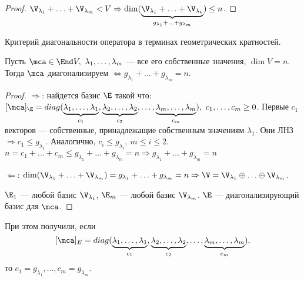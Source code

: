 \documentclass[main]{subfiles}
\begin{document}
\begin{proof}
    $\V_{\lambda_1} + \ldots + \V_{\lambda_m} < V 
    \Rightarrow \dim (\underbrace{\V_{\lambda_1} + \ldots + \V_{\lambda_k}}_{g_{\lambda_1} + \ldots + g_{\lambda_m}}) \leq n$.
\end{proof}

\begin{proposition}
    Критерий диагональности оператора в терминах геометрических кратностей.

    Пусть $\mca \in \End V,\ \lambda_1, \ldots, \lambda_m$  — все его собственные значения, 
    $\dim V = n$. Тогда $\mca$  диагонализируем $\Leftrightarrow
    g_{\lambda_1} + \ldots +  g_{\lambda_m} = n$.
\end{proposition}

\begin{proof}
    $\Rightarrow$: найдется базис $\E$ такой что: 
    $[\mca]_\E = diag(\underbrace{\lambda_1, \ldots, \lambda_1}_{c_1},
    \underbrace{\lambda_2, \ldots, \lambda_2}_{c_2}, \ldots,
    \underbrace{\lambda_m, \ldots, \lambda_m}_{c_m}), \  c_1, \ldots, c_m \geq 0$.
    Первые $c_1$  векторов  — собственные, принадлежащие собственным значениям 
    $\lambda_1$. Они ЛНЗ $\Rightarrow c_1 \leq g_{\lambda_1}$.
    Аналогично, $c_i \leq g_{\lambda_i},\ m \leq i \leq 2$.
    $n = c_1 + \ldots + c_m \leq g_{\lambda_1} + \ldots + g_{\lambda_m} = n
    \Rightarrow g_{\lambda_1} + \ldots + g_{\lambda_m} = n$

    $\Leftarrow$: $\dim (\V_{\lambda_1} + \ldots + \V_{\lambda_m}) =
    g_{\lambda_1} + \ldots + g_{\lambda_m} = n \Rightarrow
    \V = \V_{\lambda_1} \oplus \ldots \oplus  \V_{\lambda_m}$.

    $\E_1$  — любой базис $\V_{\lambda_1}$,  
    $\E_m$  — любой базис $\V_{\lambda_m}$. 
    $\E$  — диагонализирующий базис для $\mca$.
\end{proof}

\begin{remark}
    При этом получили, если
    \[[\mca]_E = diag(\underbrace{\lambda_1, \ldots, \lambda_1}_{c_1},
        \underbrace{\lambda_2, \ldots, \lambda_2}_{c_2}, \ldots,
        \underbrace{\lambda_m, \ldots, \lambda_m}_{c_m}),\]
    то $c_1 = g_{\lambda_1}, \ldots,c_m = g_{\lambda_m}$.
\end{remark}
\end{document}
